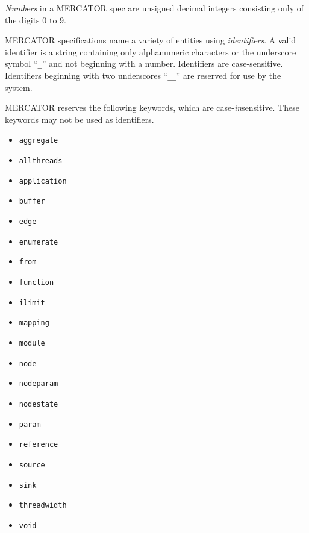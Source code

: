 \documentclass[11pt]{article}
\begin{document}
\textit{Numbers} in a MERCATOR spec are unsigned decimal integers
consisting only of the digits 0 to 9.

MERCATOR specifications name a variety of entities using
\textit{identifiers}.  A valid identifier is a string containing only
alphanumeric characters or the underscore symbol ``\texttt{_}'' and
not beginning with a number.  Identifiers are case-sensitive.
Identifiers beginning with two underscores ``\texttt{__}'' are
reserved for use by the system.

MERCATOR reserves the following keywords, which are
case-\emph{in}sensitive.  These keywords may not be used as
identifiers.
\begin{multicols}{4}
\begin{itemize}
 \item \texttt{aggregate}
 \item \texttt{allthreads}
 \item \texttt{application}
 \item \texttt{buffer}
 \item \texttt{edge}
 \item \texttt{enumerate}
 \item \texttt{from}
 \item \texttt{function}
 \item \texttt{ilimit}
 \item \texttt{mapping}
 \item \texttt{module}
 \item \texttt{node}
 \item \texttt{nodeparam}
 \item \texttt{nodestate}
 \item \texttt{param}
 \item \texttt{reference}
 \item \texttt{source}
 \item \texttt{sink}
 \item \texttt{threadwidth}
 \item \texttt{void}
\end{itemize}
\end{multicols}
\end{document}
